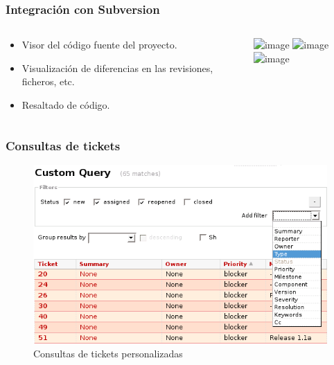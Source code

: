 \documentclass{beamer}
\begin{document}
\begin{frame}
    \frametitle{Integración con Subversion}

    \begin{columns}

    \begin{column}{5cm}
        \begin{itemize}
            \item<1->
                Visor del código fuente del proyecto.
            \item<3->
                Visualización de diferencias en las revisiones, ficheros, etc.
            \item<6->
                Resaltado de código.
        \end{itemize}
    \end{column}

    \begin{column}{5cm}
        \begin{overprint}
            \includegraphics<2>[scale=0.2]{pix/subversion}
            \includegraphics<4>[scale=0.2]{pix/changeset}
            \includegraphics<5>[scale=0.4]{pix/changeset2}
        \end{overprint}
    \end{column}

    \end{columns}
\end{frame}

\begin{frame}
    \frametitle{Consultas de tickets}

    \begin{figure}
        \includegraphics[scale=0.3]{pix/tickets}
        \caption{Consultas de tickets personalizadas}
    \end{figure}

\end{frame}
\end{document}
